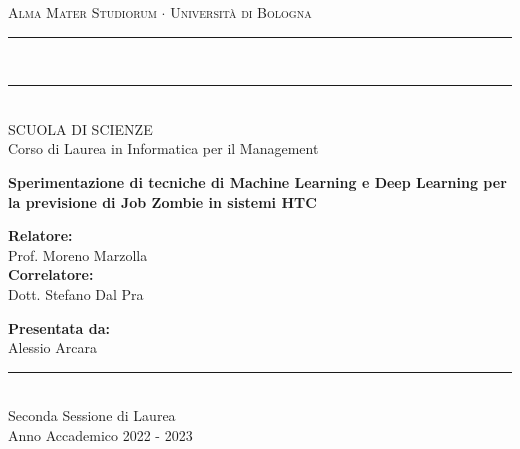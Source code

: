 \begin{titlepage}
  \centering
  {\Large \textsc{Alma Mater Studiorum $\cdot$ Università di Bologna}} \\
  \vspace{1mm}
  \rule[0.1cm]{15.8cm}{0.1mm} \\
  \rule[0.5cm]{15.8cm}{0.6mm} \\
  {\small SCUOLA DI SCIENZE \\
  Corso di Laurea in Informatica per il Management} \\
  
  \vspace{40mm}
  
  {\LARGE \textbf{Sperimentazione di tecniche di Machine Learning e Deep
  Learning per la  previsione di Job Zombie in sistemi HTC}} \\
  
  \vspace{40mm}
  
  \begin{minipage}[t]{0.47\textwidth}
    \raggedright
    \large \textbf{Relatore:} \\
    Prof. Moreno Marzolla \\
    \vspace{5mm}
    \textbf{Correlatore:} \\ 
    Dott. Stefano Dal Pra \\
  \end{minipage}
  \hfill
  \begin{minipage}[t]{0.47\textwidth}
    \raggedleft
    \large \textbf{Presentata da:} \\
    Alessio Arcara
  \end{minipage}
  
  \vspace{20mm}
  
  \rule[0.1cm]{15.8cm}{0.1mm} \\
  {\large Seconda Sessione di Laurea \\
  Anno Accademico 2022 - 2023}

\end{titlepage}
